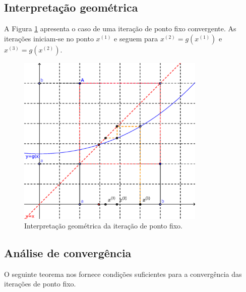 \subsection{Interpretação geométrica}

A Figura \ref{fig:pfixo_interp} apresenta o caso de uma iteração de ponto fixo convergente. As iterações iniciam-se no ponto $x^{(1)}$ e seguem para $x^{(2)} = g(x^{(1)})$ e $x^{(3)} = g(x^{(2)})$.

\begin{figure}[h!]
  \centering
  \includegraphics[width=0.8\textwidth]{./cap_eq1d/dados/fig_pfixo_interp/fig_pfixo_interp}
  \caption{Interpretação geométrica da iteração de ponto fixo.}
  \label{fig:pfixo_interp}
\end{figure}

\subsection{Análise de convergência}

O seguinte teorema nos fornece condições suficientes para a convergência das iterações de ponto fixo.

